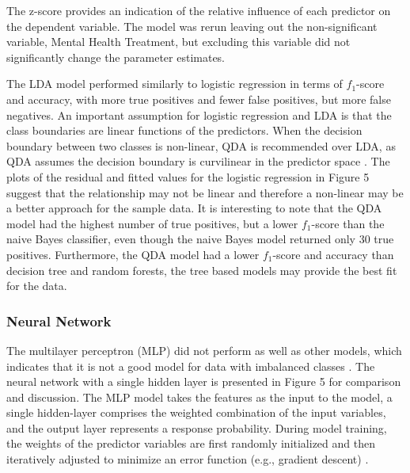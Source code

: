 

The z-score provides an indication of the relative influence of each predictor 
on the dependent variable. The model was rerun leaving out the non-significant 
variable, Mental Health Treatment, but excluding this variable did not 
significantly change the parameter estimates. 


The LDA model performed similarly to logistic regression in terms of 
$f_1$-score and accuracy, with more true positives and fewer false 
positives, but more false negatives. An important assumption for logistic
regression and LDA is that the class boundaries are linear functions 
of the predictors. When the decision boundary between two classes is 
non-linear, QDA is recommended over LDA, as QDA assumes the decision 
boundary is curvilinear in the predictor space \cite{kuhn13}. The plots 
of the residual and fitted values for the logistic regression in Figure 5
suggest that the relationship may not be linear and therefore a non-linear
may be a better approach for the sample data. It is interesting to note 
that the QDA model had the highest number of true positives, but a lower 
$f_1$-score than the naive Bayes classifier, even though the naive Bayes 
model returned only 30 true positives. Furthermore, the QDA model had a 
lower $f_1$-score and accuracy than decision tree and random forests, 
the tree based models may provide the best fit for the data. 


\subsubsection{Neural Network}

The multilayer perceptron (MLP) did not perform as well as other models, 
which indicates that it is not a good model for data with imbalanced classes 
\cite{yun09}. The neural network with a single hidden layer is presented in 
Figure 5 for comparison and discussion. The MLP model takes the features as 
the input to the model, a single hidden-layer comprises the weighted 
combination of the input variables, and the output layer represents a 
response probability. During model training, the weights of the predictor 
variables are first randomly initialized and then iteratively adjusted to 
minimize an error function (e.g., gradient descent) \cite{brown12}. 

